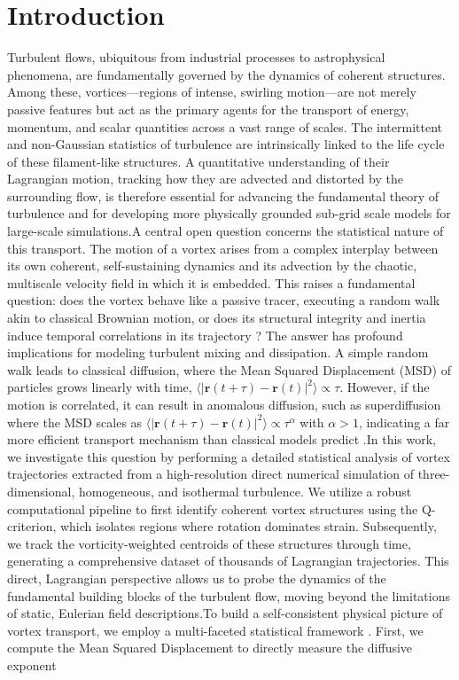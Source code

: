 \documentclass[]{article}
\begin{document}
\section{Introduction}
\label{sec:intro}
Turbulent flows, ubiquitous from industrial processes to astrophysical phenomena, are fundamentally governed by the dynamics of coherent structures. Among these, vortices—regions of intense, swirling motion—are not merely passive features but act as the primary agents for the transport of energy, momentum, and scalar quantities across a vast range of scales. The intermittent and non-Gaussian statistics of turbulence are intrinsically linked to the life cycle of these filament-like structures. A quantitative understanding of their Lagrangian motion, tracking how they are advected and distorted by the surrounding flow, is therefore essential for advancing the fundamental theory of turbulence and for developing more physically grounded sub-grid scale models for large-scale simulations.A central open question concerns the statistical nature of this transport. The motion of a vortex arises from a complex interplay between its own coherent, self-sustaining dynamics and its advection by the chaotic, multiscale velocity field in which it is embedded. This raises a fundamental question: does the vortex behave like a passive tracer, executing a random walk akin to classical Brownian motion, or does its structural integrity and inertia induce temporal correlations in its trajectory  \citep{maiti2025vorticitypackingeffectslong}? The answer has profound implications for modeling turbulent mixing and dissipation. A simple random walk leads to classical diffusion, where the Mean Squared Displacement (MSD) of particles grows linearly with time, $\langle |\mathbf{r}(t+\tau) - \mathbf{r}(t)|^2 \rangle \propto \tau$. However, if the motion is correlated, it can result in anomalous diffusion, such as superdiffusion where the MSD scales as $\langle |\mathbf{r}(t+\tau) - \mathbf{r}(t)|^2 \rangle \propto \tau^\alpha$ with $\alpha > 1$, indicating a far more efficient transport mechanism than classical models predict  \citep{leoncini2002jetsstickinessanomaloustransport,maiti2025vorticitypackingeffectslong}.In this work, we investigate this question by performing a detailed statistical analysis of vortex trajectories extracted from a high-resolution direct numerical simulation of three-dimensional, homogeneous, and isothermal turbulence. We utilize a robust computational pipeline to first identify coherent vortex structures using the Q-criterion, which isolates regions where rotation dominates strain. Subsequently, we track the vorticity-weighted centroids of these structures through time, generating a comprehensive dataset of thousands of Lagrangian trajectories. This direct, Lagrangian perspective allows us to probe the dynamics of the fundamental building blocks of the turbulent flow, moving beyond the limitations of static, Eulerian field descriptions.To build a self-consistent physical picture of vortex transport, we employ a multi-faceted statistical framework  \citep{kumar2025trappingtransportinertialparticles,aulnette2025transportsphericalmicroparticles3d}. First, we compute the Mean Squared Displacement to directly measure the diffusive exponent 
\end{document}
